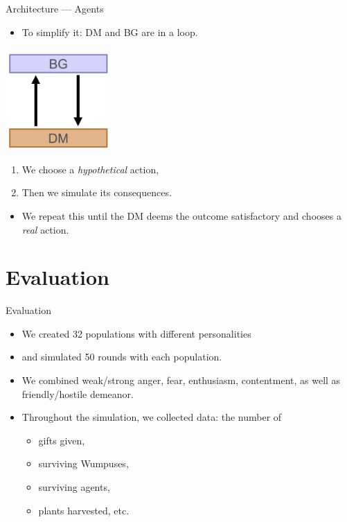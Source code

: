 \documentclass{beamer}
\begin{document}
   \begin{frame}{Architecture --- Agents}
      \begin{itemize}
         \item To simplify it: DM and BG are in a loop.
      \end{itemize}
      
      \begin{center}
         \includegraphics[width=0.3\textwidth]{bg_dm_loop.png}
      \end{center}
      
      \begin{enumerate}
         \item We choose a \emph{hypothetical} action,
         \item Then we simulate its consequences.
      \end{enumerate}
      
      \begin{itemize}
         \item We repeat this until the DM deems the outcome satisfactory and chooses a \emph{real} action.
      \end{itemize}
   \end{frame}
   
   \section{Evaluation}
   
   \begin{frame}{Evaluation}
      \begin{itemize}
         \item We created 32 populations with different personalities
         \item and simulated 50 rounds with each population.
         \item We combined weak/strong anger, fear, enthusiasm, contentment, as well as friendly/hostile demeanor.
         \item Throughout the simulation, we collected data: the number of
         \begin{itemize}
            \item gifts given,
            \item surviving Wumpuses,
            \item surviving agents,
            \item plants harvested, etc.
         \end{itemize}
      \end{itemize}
   \end{frame}
   
\end{document}
